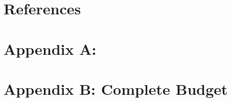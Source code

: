 \documentclass[12pt]{article}
\begin{document}
\newpage
\section{References}




\newpage
\section{Appendix A: }




\section{Appendix B: Complete Budget}
\end{document}
